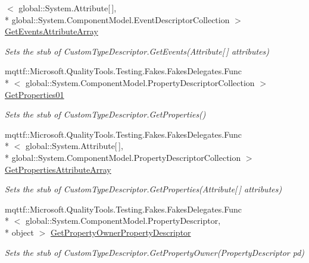\begin{DoxyCompactItemize}
$<$ global\-::\-System.\-Attribute\mbox{[}$\,$\mbox{]}, \\*
global\-::\-System.\-Component\-Model.\-Event\-Descriptor\-Collection $>$ \hyperlink{class_system_1_1_component_model_1_1_fakes_1_1_stub_custom_type_descriptor_a7c979a3648e4eba1e36997d861b189c3}{Get\-Events\-Attribute\-Array}
\begin{DoxyCompactList}\small\item\em Sets the stub of Custom\-Type\-Descriptor.\-Get\-Events(\-Attribute\mbox{[}$\,$\mbox{]} attributes)\end{DoxyCompactList}\item 
mqttf\-::\-Microsoft.\-Quality\-Tools.\-Testing.\-Fakes.\-Fakes\-Delegates.\-Func\\*
$<$ global\-::\-System.\-Component\-Model.\-Property\-Descriptor\-Collection $>$ \hyperlink{class_system_1_1_component_model_1_1_fakes_1_1_stub_custom_type_descriptor_a05452af5f62539ef49ea6ff95e4db746}{Get\-Properties01}
\begin{DoxyCompactList}\small\item\em Sets the stub of Custom\-Type\-Descriptor.\-Get\-Properties()\end{DoxyCompactList}\item 
mqttf\-::\-Microsoft.\-Quality\-Tools.\-Testing.\-Fakes.\-Fakes\-Delegates.\-Func\\*
$<$ global\-::\-System.\-Attribute\mbox{[}$\,$\mbox{]}, \\*
global\-::\-System.\-Component\-Model.\-Property\-Descriptor\-Collection $>$ \hyperlink{class_system_1_1_component_model_1_1_fakes_1_1_stub_custom_type_descriptor_a6b72cf544557e2731a5fc95c011371ee}{Get\-Properties\-Attribute\-Array}
\begin{DoxyCompactList}\small\item\em Sets the stub of Custom\-Type\-Descriptor.\-Get\-Properties(\-Attribute\mbox{[}$\,$\mbox{]} attributes)\end{DoxyCompactList}\item 
mqttf\-::\-Microsoft.\-Quality\-Tools.\-Testing.\-Fakes.\-Fakes\-Delegates.\-Func\\*
$<$ global\-::\-System.\-Component\-Model.\-Property\-Descriptor, \\*
object $>$ \hyperlink{class_system_1_1_component_model_1_1_fakes_1_1_stub_custom_type_descriptor_a55adb87fae24805735e50dd6e95d6bf5}{Get\-Property\-Owner\-Property\-Descriptor}
\begin{DoxyCompactList}\small\item\em Sets the stub of Custom\-Type\-Descriptor.\-Get\-Property\-Owner(\-Property\-Descriptor pd)\end{DoxyCompactList}\end{DoxyCompactItemize}
